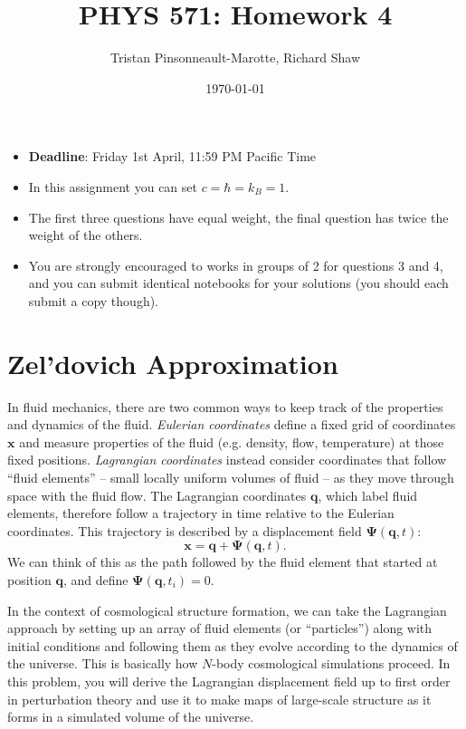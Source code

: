 \documentclass[12pt]{article}
\author{Tristan Pinsonneault-Marotte, Richard Shaw}
\title{PHYS 571: Homework 4}
\date{\today}
\begin{document}
\maketitle


\begin{itemize}
    \item \textbf{Deadline}: Friday 1st April, 11:59 PM Pacific Time
    \item In this assignment you can set $c = \hbar = k_B = 1$.
    \item The first three questions have equal weight, the final question has twice the weight of the others.
    \item You are strongly encouraged to works in groups of 2 for questions 3 and 4, and you can submit identical notebooks for your solutions (you should each submit a copy though).
\end{itemize}

\section{Zel'dovich Approximation}

In fluid mechanics, there are two common ways to keep track of the properties
and dynamics of the fluid. \emph{Eulerian coordinates} define a fixed grid of
coordinates $\mathbf{x}$ and measure properties of the fluid (e.g. density,
flow, temperature) at those fixed positions. \emph{Lagrangian coordinates}
instead consider coordinates that follow ``fluid elements'' -- small locally
uniform volumes of fluid -- as they move through space with the fluid flow. The
Lagrangian coordinates $\mathbf{q}$, which label fluid elements, therefore
follow a trajectory in time relative to the Eulerian coordinates. This
trajectory is described by a displacement field $\mathbf{\Psi}(\mathbf{q}, t)$:
\begin{equation}
    \mathbf{x} = \mathbf{q} + \mathbf{\Psi}(\mathbf{q}, t) \text{.}
\end{equation}
We can think of this as the path followed by the fluid element that started at
position $\mathbf{q}$, and define $\mathbf{\Psi}(\mathbf{q}, t_i) = 0$.

In the context of cosmological structure formation, we can take the Lagrangian
approach by setting up an array of fluid elements (or ``particles'') along with
initial conditions and following them as they evolve according to the dynamics
of the universe. This is basically how $N$-body cosmological simulations
proceed. In this problem, you will derive the Lagrangian displacement field up
to first order in perturbation theory and use it to make maps of large-scale
structure as it forms in a simulated volume of the universe.
\end{document}
